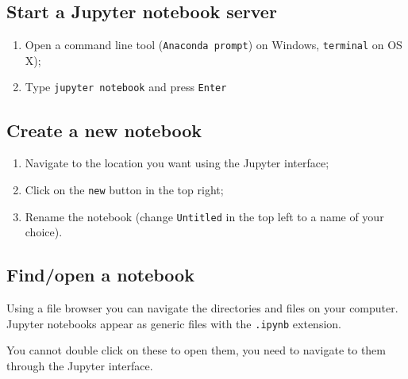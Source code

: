 \subsection{Start a Jupyter notebook server}


\begin{enumerate}

\item 

    Open a command line tool (\texttt{Anaconda prompt}) on Windows,
        \texttt{terminal} on OS X);

\item 

    Type \texttt{jupyter notebook} and press \texttt{Enter}

\end{enumerate}


\subsection{Create a new notebook}
\begin{enumerate}

\item 

Navigate to the location you want using the Jupyter interface;

\item 

Click on the \texttt{new} button in the top right;

\item 

Rename the notebook (change \texttt{Untitled} in the top left to a name of your choice).

\end{enumerate}


\subsection{Find/open a notebook}

Using a file browser you can navigate the directories and files on your
computer. Jupyter notebooks appear as generic files with the \texttt{.ipynb}
extension.


You cannot double click on these to open them, you need to navigate to them through the Jupyter interface.


